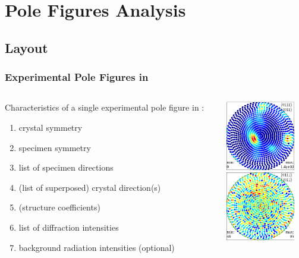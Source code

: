 \section{Pole Figures Analysis}

\subsection*{Layout}

\begin{frame}[fragile]
  \frametitle{Experimental Pole Figures in \MTEX}

  \begin{columns}

    \begin{column}{8.2cm}

      Characteristics of a single experimental pole figure in \mtex:
      \begin{enumerate}
      \item crystal symmetry
      \item specimen symmetry
      \item list of specimen directions
      \item (list of superposed) crystal direction(s)
      \item (structure coefficients)
      \item list of diffraction intensities
      \item background radiation intensities (optional)
      \end{enumerate}

    \end{column}

    \begin{column}{3cm}
      \includegraphics[width=3cm]{pic/pf1}\\
      \includegraphics[width=3cm]{pic/pfso9_bg}
    \end{column}


  \end{columns}


\end{frame}


